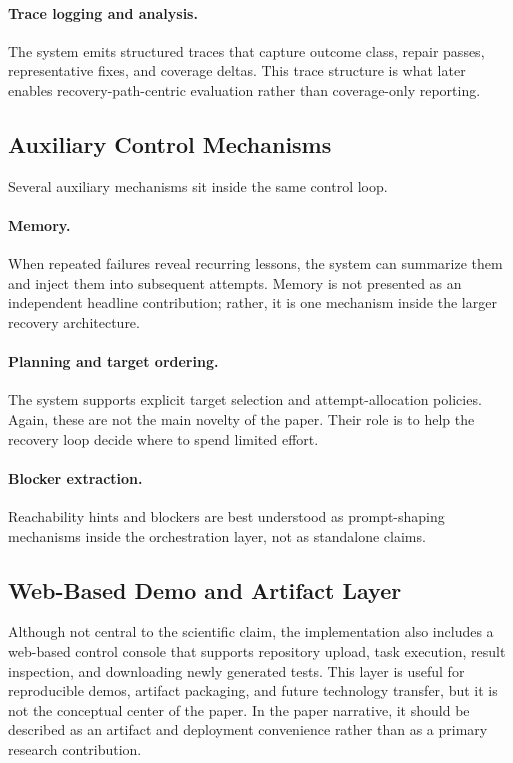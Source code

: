 \documentclass[10pt]{article}
\begin{document}
\paragraph{Trace logging and analysis.}
The system emits structured traces that capture outcome class, repair passes, representative fixes, and coverage deltas. This trace structure is what later enables recovery-path-centric evaluation rather than coverage-only reporting.

\subsection{Auxiliary Control Mechanisms}

Several auxiliary mechanisms sit inside the same control loop.

\paragraph{Memory.}
When repeated failures reveal recurring lessons, the system can summarize them and inject them into subsequent attempts. Memory is not presented as an independent headline contribution; rather, it is one mechanism inside the larger recovery architecture.

\paragraph{Planning and target ordering.}
The system supports explicit target selection and attempt-allocation policies. Again, these are not the main novelty of the paper. Their role is to help the recovery loop decide where to spend limited effort.

\paragraph{Blocker extraction.}
Reachability hints and blockers are best understood as prompt-shaping mechanisms inside the orchestration layer, not as standalone claims.

\subsection{Web-Based Demo and Artifact Layer}

Although not central to the scientific claim, the implementation also includes a web-based control console that supports repository upload, task execution, result inspection, and downloading newly generated tests. This layer is useful for reproducible demos, artifact packaging, and future technology transfer, but it is not the conceptual center of the paper. In the paper narrative, it should be described as an artifact and deployment convenience rather than as a primary research contribution.
\end{document}

